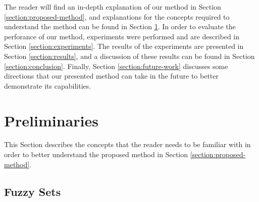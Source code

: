 \documentclass{ieeeaccess}
\begin{document}

The reader will find an in-depth explanation of our method in Section
\ref{section:proposed-method}, and explanations for the concepts
required to understand the method can be found in Section
\ref{section:preliminaries}. In order to evaluate
the perforance of our method, experiments were performed and are
described in Section \ref{section:experiments}. The results of the
experiments are presented in Section \ref{section:results}, and a
discussion of these results can be found in Section
\ref{section:conclusion}. Finally, Section \ref{section:future-work}
discusses some directions that our presented method can take in the
future to better demonstrate its capabilities.

\section{Preliminaries}
\label{section:preliminaries}
%

This Section describes the concepts that the reader needs to be familiar with in
order to better understand the proposed method in Section
\ref{section:proposed-method}.%

\subsection{Fuzzy Sets}
\label{subsection:fuzzy-sets}
\end{document}
